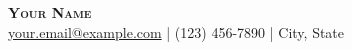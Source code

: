\documentclass[11pt,a4paper]{article}
\begin{document}
\pagestyle{empty}

\begin{center}
    {\huge \bfseries \scshape Your Name}\\[0.5em]
    \href{mailto:your.email@example.com}{your.email@example.com} | (123) 456-7890 | City, State
\end{center}
\end{document}
